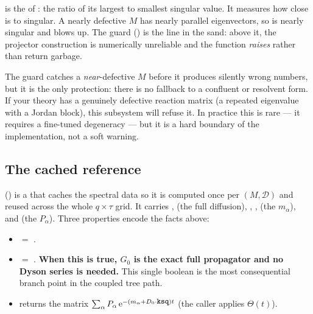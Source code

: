 \begin{defn}
 is the  of : the ratio
of its largest to smallest singular value. It measures how close  is to
singular. A nearly defective $M$ has nearly parallel eigenvectors, so 
is nearly singular and  blows up. The guard
 () is the line in the
sand: above it, the projector construction is numerically unreliable and the
function \emph{raises}  rather than return garbage.
\end{defn}

\begin{gotcha}
The guard catches a \emph{near}-defective $M$ before it produces silently wrong
numbers, but it is the only protection: there is no fallback to a confluent or
resolvent form. If your theory has a genuinely defective reaction matrix (a
repeated eigenvalue with a Jordan block), this subsystem will refuse it. In
practice this is rare --- it requires a fine-tuned degeneracy --- but it is a
hard boundary of the implementation, not a soft warning.
\end{gotcha}

\subsection{The cached reference}

 () is a
 that caches the spectral data so it is computed once per
$(M,\mathcal{D})$ and reused across the whole $q\times\tau$ grid. It carries
,  (the full diffusion), , , 
(the $m_{\alpha}$), and  (the $P_{\alpha}$). Three properties
encode the facts above:

\begin{itemize}
  \item {} $=$ .
  \item {} $=$ .
        \textbf{When this is true, $G_{0}$ is the exact full propagator and no
        Dyson series is needed.} This single boolean is the most consequential
        branch point in the coupled tree path.
  \item {} returns the matrix
        $\sum_{\alpha}P_{\alpha}\,\mathrm{e}^{-(m_{\alpha}+D_{0}\cdot\texttt{\small ksq})t}$
        (the caller applies $\Theta(t)$).
\end{itemize}

